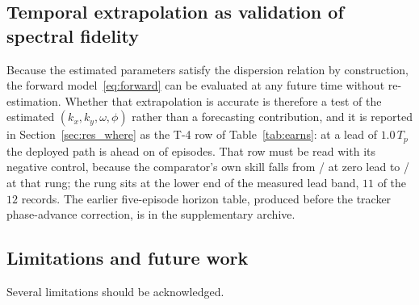 \documentclass[review]{elsarticle}
\begin{document}

\subsection{Temporal extrapolation as validation of spectral fidelity}

Because the estimated parameters satisfy the dispersion relation by
construction, the forward model~\eqref{eq:forward} can be evaluated at any future
time without re-estimation. Whether that extrapolation is accurate is therefore a
test of the estimated $(k_x, k_y, \omega, \phi)$ rather than a forecasting
contribution, and it is reported in Section~\ref{sec:res_where} as the T-4 row of
Table~\ref{tab:earns}: at a lead of $1.0\,T_p$ the deployed path is ahead on
\TFourBetter{} of \TFourN{} episodes. That row must be read with its
negative control, because the comparator's own skill falls from
\TFourCmpAtZero{}/\TFourN{} at zero lead to \TFourCmp{}/\TFourN{} at that rung;
the rung sits at the lower end of the measured lead band, $11$ of the $12$
records. The earlier five-episode horizon table, produced before the tracker
phase-advance correction, is in the supplementary archive.
\subsection{Limitations and future work}
\label{sec:limitations}

Several limitations should be acknowledged.
\end{document}
